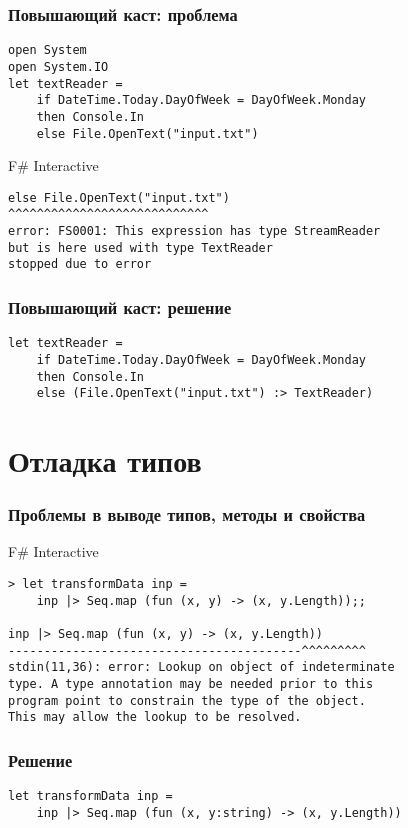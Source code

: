 \documentclass[xetex,mathserif,serif]{beamer}
\begin{document}
	\begin{frame}[fragile]
		\frametitle{Повышающий каст: проблема}
		\begin{verbatim}
open System
open System.IO
let textReader =
    if DateTime.Today.DayOfWeek = DayOfWeek.Monday
    then Console.In
    else File.OpenText("input.txt")
		\end{verbatim}

		\begin{alertblock}{F\# Interactive}
			\begin{verbatim}
else File.OpenText("input.txt")
^^^^^^^^^^^^^^^^^^^^^^^^^^^^
error: FS0001: This expression has type StreamReader 
but is here used with type TextReader 
stopped due to error
			\end{verbatim}
		\end{alertblock}
\end{frame}

	\begin{frame}[fragile]
		\frametitle{Повышающий каст: решение}
		\begin{verbatim}
let textReader =
    if DateTime.Today.DayOfWeek = DayOfWeek.Monday
    then Console.In
    else (File.OpenText("input.txt") :> TextReader)
		\end{verbatim}
\end{frame}

	\section{Отладка типов}

	\begin{frame}[fragile]
		\frametitle{Проблемы в выводе типов, методы и свойства}
		\begin{alertblock}{F\# Interactive}
			\begin{verbatim}
> let transformData inp =
    inp |> Seq.map (fun (x, y) -> (x, y.Length));;

inp |> Seq.map (fun (x, y) -> (x, y.Length))
-----------------------------------------^^^^^^^^^
stdin(11,36): error: Lookup on object of indeterminate 
type. A type annotation may be needed prior to this 
program point to constrain the type of the object. 
This may allow the lookup to be resolved.
			\end{verbatim}
		\end{alertblock}
\end{frame}

	\begin{frame}[fragile]
		\frametitle{Решение}
		\begin{verbatim}
let transformData inp =
    inp |> Seq.map (fun (x, y:string) -> (x, y.Length))
		\end{verbatim}
\end{frame}
\end{document}
